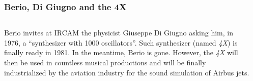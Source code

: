 \begin{frame}
    \frametitle{Berio, Di Giugno and the 4X} 

    \begin{columns}[T]
        \begin{column}{0.6\textwidth}
						Berio invites at IRCAM the physicist Giuseppe Di Giugno
						asking him, in 1976, a ``synthesizer with 1000 oscillators''.
						Such synthesizer (named \emph{4X}) is finally ready in 1981.
						In the meantime, Berio is gone.
						However, the \emph{4X} will then be used in countless musical
						productions and will be finally industrialized by the aviation
						industry for the sound simulation of Airbus jets.
        \end{column}
        \begin{column}{0.4\textwidth}
            \\
        \end{column}
    \end{columns}
\end{frame}
